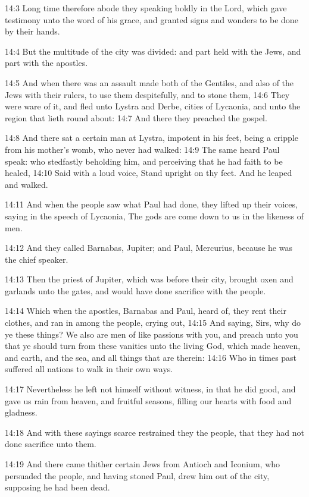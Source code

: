 14:3 Long time therefore abode they speaking boldly in the Lord, which
gave testimony unto the word of his grace, and granted signs and
wonders to be done by their hands.

14:4 But the multitude of the city was divided: and part held with the
Jews, and part with the apostles.

14:5 And when there was an assault made both of the Gentiles, and also
of the Jews with their rulers, to use them despitefully, and to stone
them, 14:6 They were ware of it, and fled unto Lystra and Derbe,
cities of Lycaonia, and unto the region that lieth round about: 14:7
And there they preached the gospel.

14:8 And there sat a certain man at Lystra, impotent in his feet,
being a cripple from his mother's womb, who never had walked: 14:9 The
same heard Paul speak: who stedfastly beholding him, and perceiving
that he had faith to be healed, 14:10 Said with a loud voice, Stand
upright on thy feet. And he leaped and walked.

14:11 And when the people saw what Paul had done, they lifted up their
voices, saying in the speech of Lycaonia, The gods are come down to us
in the likeness of men.

14:12 And they called Barnabas, Jupiter; and Paul, Mercurius, because
he was the chief speaker.

14:13 Then the priest of Jupiter, which was before their city, brought
oxen and garlands unto the gates, and would have done sacrifice with
the people.

14:14 Which when the apostles, Barnabas and Paul, heard of, they rent
their clothes, and ran in among the people, crying out, 14:15 And
saying, Sirs, why do ye these things? We also are men of like passions
with you, and preach unto you that ye should turn from these vanities
unto the living God, which made heaven, and earth, and the sea, and
all things that are therein: 14:16 Who in times past suffered all
nations to walk in their own ways.

14:17 Nevertheless he left not himself without witness, in that he did
good, and gave us rain from heaven, and fruitful seasons, filling our
hearts with food and gladness.

14:18 And with these sayings scarce restrained they the people, that
they had not done sacrifice unto them.

14:19 And there came thither certain Jews from Antioch and Iconium,
who persuaded the people, and having stoned Paul, drew him out of the
city, supposing he had been dead.

